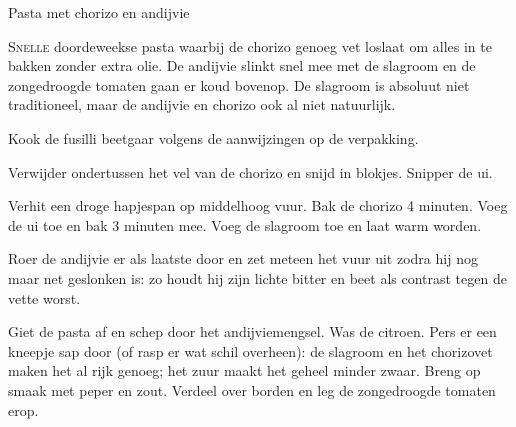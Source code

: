 \begin{recipe}{Pasta met chorizo en andijvie}


\lettrine{S}{nelle} doordeweekse pasta waarbij de chorizo genoeg vet loslaat
om alles in te bakken zonder extra olie. De andijvie slinkt snel mee met de
slagroom en de zongedroogde tomaten gaan er koud bovenop. De slagroom is absoluut
niet traditioneel, maar de andijvie en chorizo ook al niet natuurlijk.

\begin{ingredients}
\end{ingredients}

\begin{steps}
  \item Kook de fusilli beetgaar volgens de aanwijzingen op de verpakking.
  \item Verwijder ondertussen het vel van de chorizo en snijd in blokjes.
        Snipper de ui.
  \item Verhit een droge hapjespan op middelhoog vuur. Bak de chorizo
        4 minuten. Voeg de ui toe en bak 3 minuten mee. Voeg de slagroom
        toe en laat warm worden.
  \item Roer de andijvie er als laatste door en zet meteen het vuur uit zodra
        hij nog maar net geslonken is: zo houdt hij zijn lichte bitter en beet
        als contrast tegen de vette worst.
  \item Giet de pasta af en schep door het andijviemengsel. Was de citroen. Pers er een
        kneepje sap door (of rasp er wat schil overheen): de slagroom
        en het chorizovet maken het al rijk genoeg; het zuur maakt het geheel
        minder zwaar. Breng op smaak met peper en zout. Verdeel over borden
        en leg de zongedroogde tomaten erop.
\end{steps}
\end{recipe}

